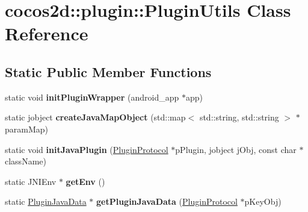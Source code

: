 \hypertarget{classcocos2d_1_1plugin_1_1PluginUtils}{}\section{cocos2d\+:\+:plugin\+:\+:Plugin\+Utils Class Reference}
\label{classcocos2d_1_1plugin_1_1PluginUtils}
\subsection*{Static Public Member Functions}
\begin{DoxyCompactItemize}
\item 
\mbox{\label{classcocos2d_1_1plugin_1_1PluginUtils_ac417cd5bc40afa6a27e0457712b805ea}} 
static void {\bfseries init\+Plugin\+Wrapper} (android\+\_\+app $\ast$app)
\item 
\mbox{\label{classcocos2d_1_1plugin_1_1PluginUtils_abf7f3ef7e13f7709a98710b5ab8e8540}} 
static jobject {\bfseries create\+Java\+Map\+Object} (std\+::map$<$ std\+::string, std\+::string $>$ $\ast$param\+Map)
\item 
\mbox{\label{classcocos2d_1_1plugin_1_1PluginUtils_aef3b4182fff769b061632021d374bf55}} 
static void {\bfseries init\+Java\+Plugin} (\hyperlink{classcocos2d_1_1plugin_1_1PluginProtocol}{Plugin\+Protocol} $\ast$p\+Plugin, jobject j\+Obj, const char $\ast$class\+Name)
\item 
\mbox{\label{classcocos2d_1_1plugin_1_1PluginUtils_a3458949eb347a8653ee7cd1eb633bd2e}} 
static J\+N\+I\+Env $\ast$ {\bfseries get\+Env} ()
\item 
\mbox{\label{classcocos2d_1_1plugin_1_1PluginUtils_adc6efdc9c3fdb1c70f7e4051f83f37cc}} 
static \hyperlink{structcocos2d_1_1plugin_1_1__PluginJavaData__}{Plugin\+Java\+Data} $\ast$ {\bfseries get\+Plugin\+Java\+Data} (\hyperlink{classcocos2d_1_1plugin_1_1PluginProtocol}{Plugin\+Protocol} $\ast$p\+Key\+Obj)
\item 
\mbox{\label{classcocos2d_1_1plugin_1_1PluginUtils_a7cdb44ead1ca1947ef32857cb8943bed}} 

\end{DoxyCompactItemize}
